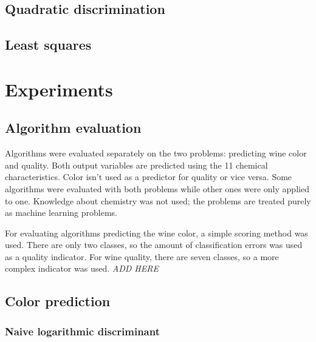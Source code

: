 \documentclass[twoside]{article}
\begin{document}
\begin{multicols}{2}
\subsection{Quadratic discrimination}

\subsection{Least squares}



\section{Experiments}

\subsection{Algorithm evaluation}

Algorithms were evaluated separately on the two problems: predicting wine color and quality.
Both output variables are predicted using the 11 chemical characteristics. Color isn't used
as a predictor for quality or vice versa.
Some algorithms were evaluated with both problems while other ones were only applied to one.
Knowledge about chemistry was not used; the problems are treated purely as machine learning
problems.

For evaluating algorithms predicting the wine color, a simple scoring method was used.
There are only two classes, so the amount of classification errors was used as a quality indicator.
For wine quality, there are seven classes, so a more complex indicator was used. \emph{ADD HERE}

\subsection{Color prediction}

\subsubsection{Naive logarithmic discriminant}


\end{multicols}
\end{document}
